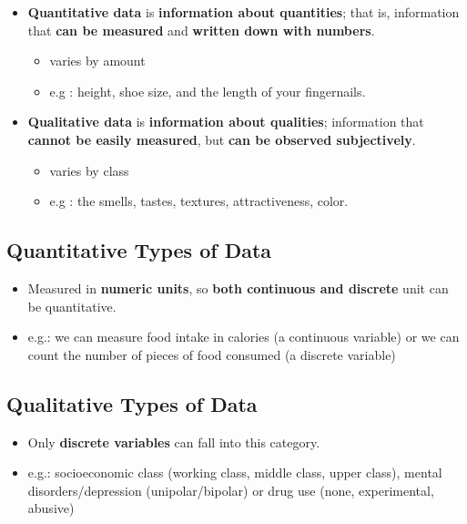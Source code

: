 \documentclass[]{article}
\providecommand{\tightlist}{%
  \setlength{\itemsep}{0pt}\setlength{\parskip}{0pt}}
\begin{document}
\begin{itemize}
\tightlist
\item
  \textbf{Quantitative data} is {\textbf{information about quantities}};
  that is, information that {\textbf{can be measured}} and
  {\textbf{written down with numbers}}.

  \begin{itemize}
  \tightlist
  \item
    varies by amount
  \item
    e.g : height, shoe size, and the length of your fingernails.
  \end{itemize}
\item
  \textbf{Qualitative data} is {\textbf{information about qualities}};
  information that {\textbf{cannot be easily measured}}, but
  {\textbf{can be observed subjectively}}.

  \begin{itemize}
  \tightlist
  \item
    varies by class
  \item
    e.g : the smells, tastes, textures, attractiveness, color.
  \end{itemize}
\end{itemize}

\hypertarget{quantitative-types-of-data}{%
\subsection{Quantitative Types of
Data}\label{quantitative-types-of-data}}

\begin{itemize}
\tightlist
\item
  Measured in {\textbf{numeric units}}, so {\textbf{both continuous and
  discrete}} unit can be quantitative.
\item
  e.g.: we can measure food intake in calories (a continuous variable)
  or we can count the number of pieces of food consumed (a discrete
  variable)
\end{itemize}

\hypertarget{qualitative-types-of-data}{%
\subsection{Qualitative Types of Data}\label{qualitative-types-of-data}}

\begin{itemize}
\tightlist
\item
  Only {\textbf{discrete variables}} can fall into this category.
\item
  e.g.: socioeconomic class (working class, middle class, upper class),
  mental disorders/depression (unipolar/bipolar) or drug use (none,
  experimental, abusive)
\end{itemize}
\end{document}
